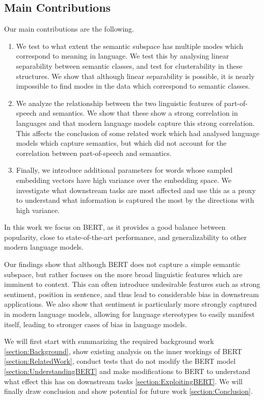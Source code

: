 \subsection{Main Contributions}

Our main contributions are the following.

\begin{enumerate}
\item We test to what extent the semantic subspace has multiple modes which correspond to meaning in language.
We test this by analysing linear separability between semantic classes, and test for clusterability in these structures.
We show that although linear separability is possible, it is nearly impossible to find modes in the data which correspond to semantic classes.
\item We analyze the relationship between the two linguistic features of part-of-speech and semantics. 
We show that these show a strong correlation in languages and that modern language models capture this strong correlation.
This affects the conclusion of some related work which had analysed language models which capture semantics, but which did not account for the correlation between part-of-speech and semantics.
\item Finally, we introduce additional parameters for words whose sampled embedding vectors have high variance over the embedding space.
We investigate what downstream tasks are most affected  and use this as a proxy to understand what information is captured the most by the directions with high variance.
\end{enumerate} 

In this work we focus on BERT, as it provides a good balance between popularity, close to state-of-the-art performance, and generalizability to other modern language models.

Our findings show that although BERT does not capture a simple semantic subspace, but rather focuses on the more broad linguistic features which are imminent to context.
This can often introduce undesirable features such as strong sentiment, position in sentence, and thus lead to considerable bias in downstream applications.
We also show that sentiment is particularly more strongly captured in modern language models, allowing for language stereotypes to easily manifest itself, leading to stronger cases of bias in language models.

We will first start with summarizing the required background work \ref{section:Background}, show existing analysis on the inner workings of BERT \ref{section:RelatedWork}, conduct tests that do not modify the BERT model \ref{section:UnderstandingBERT} and make modifications to BERT to understand what effect this has on downstream tasks \ref{section:ExploitingBERT}.
We will finally draw conclusion and show potential for future work \ref{section:Conclusion}.

\newpage
\vspace*{\fill}
